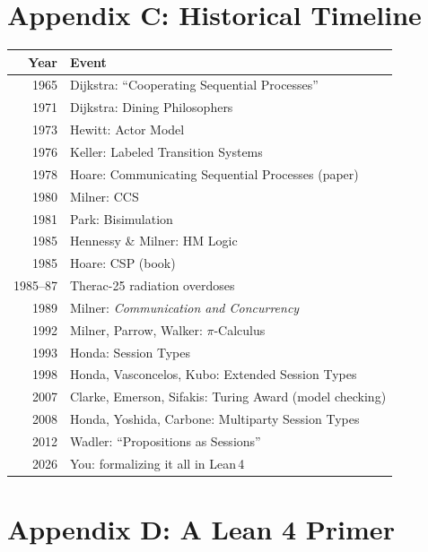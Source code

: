 \documentclass[11pt, a4paper, oneside]{book}
\begin{document}
\chapter*{Appendix C: Historical Timeline}

\begin{center}
\begin{tabular}{rl}
  \toprule
  \textbf{Year} & \textbf{Event} \\
  \midrule
  1965 & Dijkstra: ``Cooperating Sequential Processes'' \\
  1971 & Dijkstra: Dining Philosophers \\
  1973 & Hewitt: Actor Model \\
  1976 & Keller: Labeled Transition Systems \\
  1978 & Hoare: Communicating Sequential Processes (paper) \\
  1980 & Milner: CCS \\
  1981 & Park: Bisimulation \\
  1985 & Hennessy \& Milner: HM Logic \\
  1985 & Hoare: CSP (book) \\
  1985--87 & Therac-25 radiation overdoses \\
  1989 & Milner: \textit{Communication and Concurrency} \\
  1992 & Milner, Parrow, Walker: $\pi$-Calculus \\
  1993 & Honda: Session Types \\
  1998 & Honda, Vasconcelos, Kubo: Extended Session Types \\
  2007 & Clarke, Emerson, Sifakis: Turing Award (model checking) \\
  2008 & Honda, Yoshida, Carbone: Multiparty Session Types \\
  2012 & Wadler: ``Propositions as Sessions'' \\
  2026 & You: formalizing it all in Lean\,4 \\
  \bottomrule
\end{tabular}
\end{center}

\chapter*{Appendix D: A Lean 4 Primer}\label{app:primer}
\end{document}
